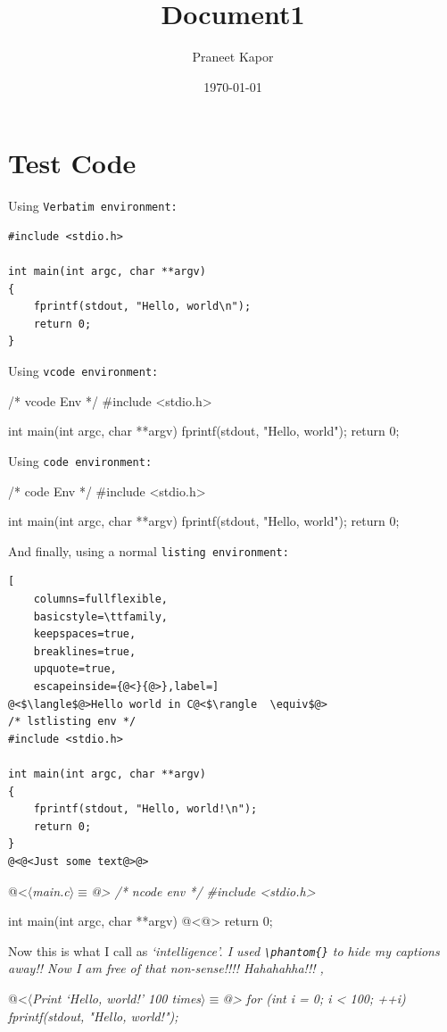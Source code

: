 \documentclass{article}
\begin{document}
\title{Document1}
\author{Praneet Kapor}
\date{\today}
\maketitle

\section{Test Code}
Using \tt Verbatim \rm environment:

\begin{Verbatim}
#include <stdio.h>

int main(int argc, char **argv)
{
    fprintf(stdout, "Hello, world\n");
    return 0;
}
\end{Verbatim}

\noindent Using \tt vcode \rm environment:

\begin{vcode}
/* vcode Env */
#include <stdio.h>

int main(int argc, char **argv)
{
    fprintf(stdout, "Hello, world\n");
    return 0;
}
\end{vcode}

\noindent Using \tt code \rm environment:

\begin{code}
/* code Env */
#include <stdio.h>

int main(int argc, char **argv)
{
    fprintf(stdout, "Hello, world\n");
    return 0;
}
\end{code}

\noindent And finally, using a normal \tt listing \rm environment:

\begin{lstlisting}[
    columns=fullflexible,
    basicstyle=\ttfamily,
    keepspaces=true,
    breaklines=true,
    upquote=true,
    escapeinside={@<}{@>},label=]
@<$\langle$@>Hello world in C@<$\rangle  \equiv$@>
/* lstlisting env */
#include <stdio.h>

int main(int argc, char **argv)
{
    fprintf(stdout, "Hello, world!\n");
    return 0;
}
@<@<Just some text@>@>
\end{lstlisting}


\begin{ncode}[main.c]
@<$\langle$\it main.c\rm$\rangle \equiv$@>
/* ncode env */
#include <stdio.h>

int main(int argc, char **argv)
{
    @<@>
    return 0;
}
\end{ncode}

\noindent Now this is what I call as \it `intelligence'\rm. I used \verb|\phantom{}| to hide my captions
away!! Now I am free of that non-sense!!!! Hahahahha!!! \textheight, \textwidth

\begin{ncode}
@<$\langle$\it Print `Hello, world!' 100 times\rm$\rangle \equiv$@>
for (int i = 0; i < 100; ++i)
{
    fprintf(stdout, "Hello, world!\n");
}
\end{ncode}


\lstlistoflistings
\end{document}
